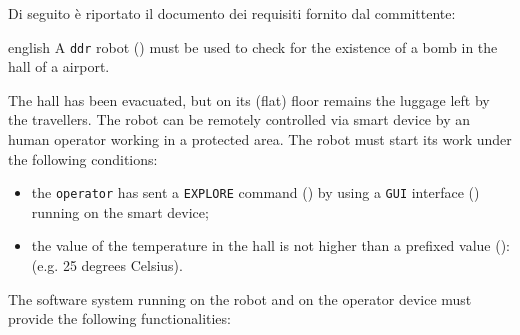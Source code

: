 

Di seguito è riportato il documento dei requisiti fornito dal committente:

\begin{foreigndisplayquote}{english}
  A \texttt{ddr} robot () must be used to check for the existence of a bomb in the hall of a airport.

  The hall has been evacuated, but on its (flat) floor remains the luggage left by the travellers.
  The robot  can be remotely controlled via smart device by an human operator working in a protected area.
  The robot must start its work under the following conditions:

  \begin{itemize}
    \item the \texttt{operator} has sent a \texttt{EXPLORE} command () by using a \texttt{GUI} interface () running on the smart device;
    \item the value of the temperature in the hall is not higher than a prefixed value (): (e.g. 25 degrees Celsius).
  \end{itemize}

  The software system running on the robot and on the operator device must provide the following functionalities:


\end{foreigndisplayquote}
